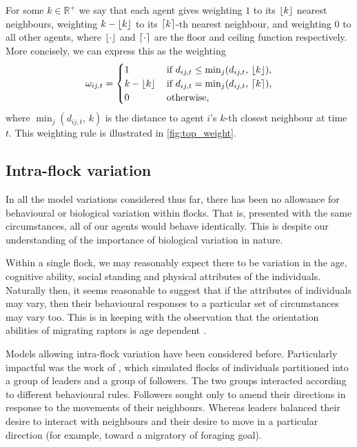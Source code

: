 For some $k\in\mathbb{R}^+$ we say that each agent gives weighting $1$ to its
$\lfloor k\rfloor$ nearest neighbours, weighting $k - \lfloor k\rfloor$ to its $\lceil k\rceil$-th
nearest neighbour, and weighting $0$ to all other agents, where $\lfloor\cdot\rfloor$
and $\lceil\cdot\rceil$ are the floor and ceiling function respectively. More
concisely, we can express this as the weighting
\begin{equation}
  \label{eq:top_interaction}
  \omega_{ij,t} =
  \begin{cases}
    1           & \, \text{if } d_{ij, t} \leq \min_j(d_{ij,t},\, \lfloor k\rfloor), \\
    k-\lfloor k\rfloor & \, \text{if } d_{ij, t} = \min_j(d_{ij,t},\, \lceil k\rceil),     \\
    0           & \, \text{otherwise,}
  \end{cases}
\end{equation}
where $\min_j(d_{ij,t},\, k)$ is the distance to agent $i$'s $k$-th closest
neighbour at time $t$. This weighting rule is illustrated in
\cref{fig:top_weight}.

\subsection{Intra-flock variation}

In all the model variations considered thus far, there has been no allowance
for behavioural or biological variation within flocks. That is, presented with
the same circumstances, all of our agents would behave identically. This is
despite our understanding of the importance of biological variation in nature.

Within a single flock, we may reasonably expect there to be variation in the
age, cognitive ability, social standing and physical attributes of the
individuals. Naturally then, it seems reasonable to suggest that if the
attributes of individuals may vary, then their behavioural responses to a
particular set of circumstances may vary too. This is in keeping with the
observation that the orientation abilities of migrating raptors is age
dependent \parencite{thorup03}.

Models allowing intra-flock variation have been considered before. Particularly
impactful was the work of \textcite{couzin05}, which simulated flocks of
individuals partitioned into a group of leaders and a group of followers. The
two groups interacted according to different behavioural rules. Followers
sought only to amend their directions in response to the movements of their
neighbours. Whereas leaders balanced their desire to interact with neighbours
and their desire to move in a particular direction (for example, toward a
migratory of foraging goal).

